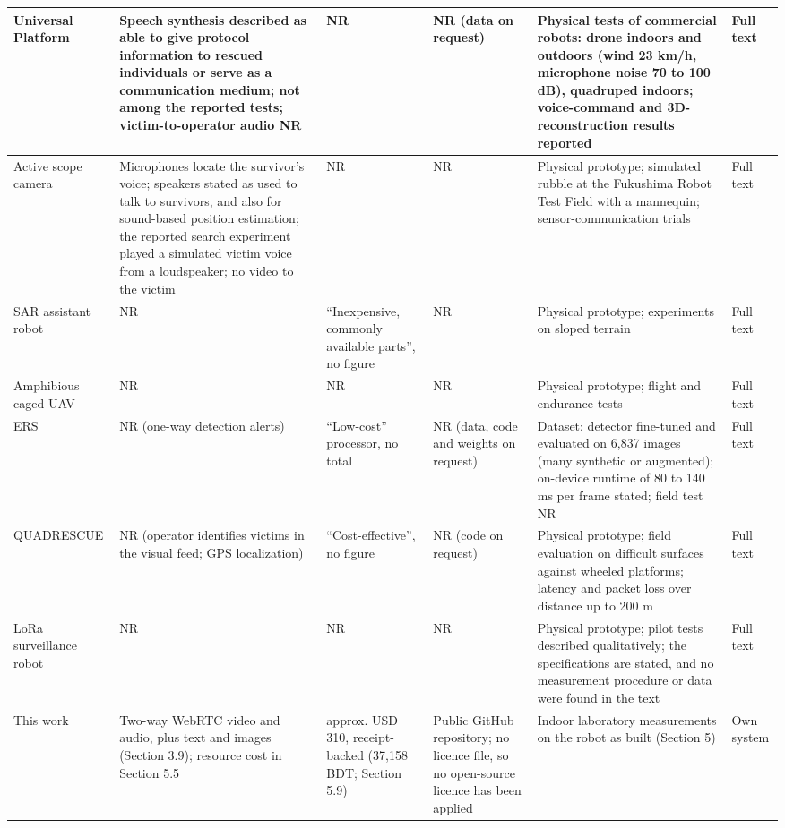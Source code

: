 \begin{center}
\begin{longtable}{|p{1.8cm}|p{3.85cm}|p{2.2cm}|p{1.8cm}|p{3.25cm}|p{1.6cm}|}
\hline
Universal Platform \cite{cafolla2026} & Speech synthesis described as able to give protocol information to rescued individuals or serve as a communication medium; not among the reported tests; victim-to-operator audio NR & NR & NR (data on request) & Physical tests of commercial robots: drone indoors and outdoors (wind 23 km/h, microphone noise 70 to 100 dB), quadruped indoors; voice-command and 3D-reconstruction results reported & Full text \\
\hline
Active scope camera \cite{yamauchi2022} & Microphones locate the survivor's voice; speakers stated as used to talk to survivors, and also for sound-based position estimation; the reported search experiment played a simulated victim voice from a loudspeaker; no video to the victim & NR & NR & Physical prototype; simulated rubble at the Fukushima Robot Test Field with a mannequin; sensor-communication trials & Full text \\
\hline
SAR assistant robot \cite{kim2023} & NR & ``Inexpensive, commonly available parts'', no figure & NR & Physical prototype; experiments on sloped terrain & Full text \\
\hline
Amphibious caged UAV \cite{jia2025} & NR & NR & NR & Physical prototype; flight and endurance tests & Full text \\
\hline
ERS \cite{raghavan2026} & NR (one-way detection alerts) & ``Low-cost'' processor, no total & NR (data, code and weights on request) & Dataset: detector fine-tuned and evaluated on 6,837 images (many synthetic or augmented); on-device runtime of 80 to 140 ms per frame stated; field test NR & Full text \\
\hline
QUADRESCUE \cite{deshmukh2025} & NR (operator identifies victims in the visual feed; GPS localization) & ``Cost-effective'', no figure & NR (code on request) & Physical prototype; field evaluation on difficult surfaces against wheeled platforms; latency and packet loss over distance up to 200 m & Full text \\
\hline
LoRa surveillance robot \cite{gehlot2025} & NR & NR & NR & Physical prototype; pilot tests described qualitatively; the specifications are stated, and no measurement procedure or data were found in the text & Full text \\
\hline
This work & Two-way WebRTC video and audio, plus text and images (Section 3.9); resource cost in Section 5.5 & approx. USD 310, receipt-backed (37,158 BDT; Section 5.9) & Public GitHub repository; no licence file, so no open-source licence has been applied & Indoor laboratory measurements on the robot as built (Section 5) & Own system \\
\hline
\end{longtable}
\end{center}

